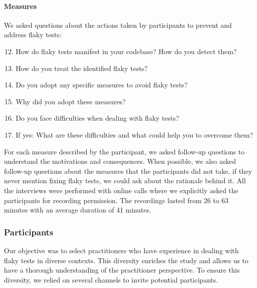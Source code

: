 \paragraph{\textbf{Measures}}
We asked questions about the actions taken by participants to prevent and address flaky tests:
\begin{enumerate}[leftmargin=*,noitemsep,topsep=0pt] \setcounter{enumi}{11}
    \item How do flaky tests manifest in your codebase? How do you detect them?
    \item How do you treat the identified flaky tests?
    \item Do you adopt any specific measures to avoid flaky tests?
    \item Why did you adopt these measures?
    \item Do you face difficulties when dealing with flaky tests? 
    \item If yes: What are these difficulties and what could help you to overcome them?
\end{enumerate}
For each measure described by the participant, we asked follow-up questions to understand the motivations and consequences.
When possible, we also asked follow-up questions about the measures that the participants did not take, \eg if they never mention fixing flaky tests, we could ask about the rationale behind it.
All the interviews were performed with online calls where we explicitly asked the participants for recording permission. 
The recordings lasted from 26 to 63 minutes with an average duration of 41 minutes.
\subsubsection{Participants}
Our objective was to select practitioners who have experience in dealing with flaky tests in diverse contexts.
This diversity enriches the study and allows us to have a thorough understanding of the practitioner perspective.
To ensure this diversity, we relied on several channels to invite potential participants.

